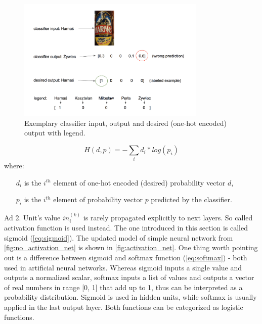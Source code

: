 \documentclass[11pt, a4paper]{article}
\begin{document}
\begin{figure}[h]
\includegraphics[width=0.8\textwidth]{probability_vectors}
\centering
\caption[Przykładowe wejście, wyjście i pożądane wyjście rozpoznawarki]{Exemplary classifier input, output and desired (one-hot encoded) output with legend.}
\label{fig:probability_vectors}
\end{figure}

\begin{equation} \label{eq:cross_entropy}
H(d, p) = -\sum_i d_i * log(p_i)
\end{equation}
where:
\begin{itemize}
\item[$d_i$] is the $i^{th}$ element of one-hot encoded (desired) probability vector $d$,
\item[$p_i$] is the $i^{th}$ element of probability vector $p$ predicted by the classifier.
\end{itemize}

Ad 2. Unit's value $in_i^{(k)}$ is rarely propagated explicitly to next layers. So called activation function is used instead. The one introduced in this section is called sigmoid (\autoref{eq:sigmoid}). The updated model of simple neural network from \autoref{fig:no_activation_net} is shown in \autoref{fig:activation_net}. One thing worth pointing out is a difference between sigmoid and softmax function (\autoref{eq:softmax}) - both used in artificial neural networks. Whereas sigmoid inputs a single value and outputs a normalized scalar, softmax inputs a list of values and outputs a vector of real numbers in range [0, 1] that add up to 1, thus can be interpreted as a probability distribution. Sigmoid is used in hidden units, while softmax is usually applied in the last output layer. Both functions can be categorized as logistic functions.\\
\end{document}

